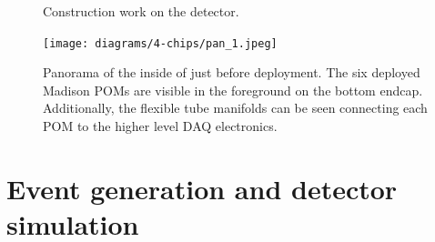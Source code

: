 \begin{figure} %
    \centering
    \quad
    \caption[afaga]
    {Construction work on the \chipsfive detector.}
    \label{fig:work2}
\end{figure}

\begin{figure} %
    \texttt{[image: diagrams/4-chips/pan\_1.jpeg]}
    \caption[Panorama of the inside of \chipsfive just before deployment.]
    {Panorama of the inside of \chipsfive just before deployment. The six deployed Madison POMs
        are visible in the foreground on the bottom endcap. Additionally, the flexible tube
        manifolds can be seen connecting each POM to the higher level DAQ electronics.}
    \label{fig:pan_1}
\end{figure}

\section{Event generation and detector simulation} %
\label{sec:chips_monte_carlo} %

